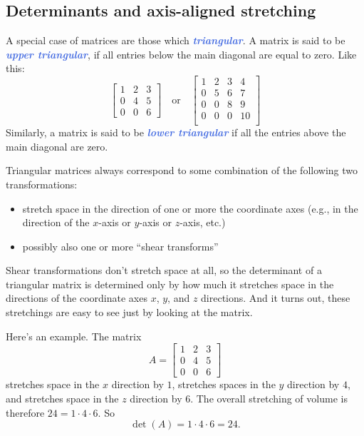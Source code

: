 \documentclass[10pt]{article}
\newcommand{\demph}[1]{\textcolor{RoyalBlue}{\textbf{\slshape #1}}} %
\theoremstyle{definition}
\begin{document}
\subsection{Determinants and axis-aligned stretching}
A special case of matrices are those which \demph{triangular}. A matrix is
said to be \demph{upper triangular}, if all entries below the main diagonal
are equal to zero. Like this:
\begin{equation*}
  \begin{bmatrix}
    1&2&3\\
    0&4&5\\
    0&0&6 
  \end{bmatrix}
  \quad \text{or} \quad
  \begin{bmatrix}
    1&2&3&4\\
    0&5&6&7\\
    0&0&8&9\\
    0&0&0&10\\
  \end{bmatrix}
\end{equation*}
Similarly, a matrix is said to be \demph{lower triangular} if all the entries
above the main diagonal are zero.

Triangular matrices always correspond to some combination of the following two
transformations:
\begin{itemize}
  \item stretch space in the direction of one or more the coordinate axes
  (e.g., in the direction of the $x$-axis or $y$-axis or $z$-axis, etc.)
  \item possibly also one or more ``shear transforms''
\end{itemize}
Shear transformations don't stretch space at all, so the determinant of a
triangular matrix is determined only by how much it stretches space in the
directions of the coordinate axes $x$, $y$, and $z$ directions. And it turns
out, these stretchings are easy to see just by looking at the matrix.

Here's an example. The matrix
\begin{equation*}
  A=\begin{bmatrix}
    1&2&3\\
    0&4&5\\
    0&0&6 
  \end{bmatrix}
\end{equation*}
stretches space in the $x$ direction by $1$, stretches spaces in the $y$
direction by $4$, and stretches space in the $z$ direction by $6$. The overall
stretching of volume is therefore $24=1\cdot4\cdot6$. So
\begin{equation*}
  \det(A) = 1\cdot4\cdot6=24.
\end{equation*}
\end{document}
